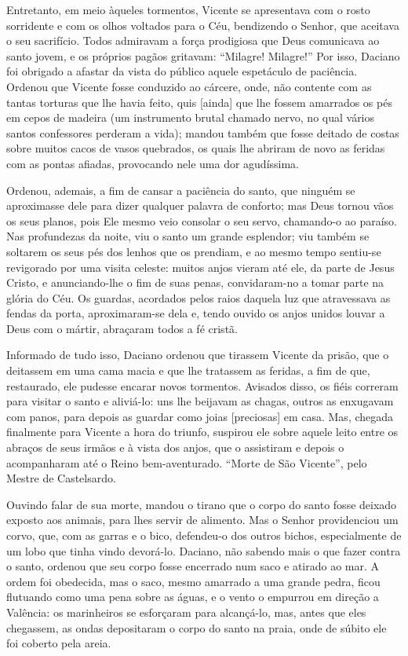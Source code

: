 \documentclass[a4paper,14pt]{extarticle} \usepackage[utf8]{inputenc}
\begin{document}
Entretanto, em meio àqueles tormentos, Vicente se apresentava com o rosto sorridente e com os olhos voltados para o Céu, bendizendo o Senhor, que aceitava o seu sacrifício. Todos admiravam a força prodigiosa que Deus comunicava ao santo jovem, e os próprios pagãos gritavam: “Milagre! Milagre!” Por isso, Daciano foi obrigado a afastar da vista do público aquele espetáculo de paciência. Ordenou que Vicente fosse conduzido ao cárcere, onde, não contente com as tantas torturas que lhe havia feito, quis [ainda] que lhe fossem amarrados os pés em cepos de madeira (um instrumento brutal chamado nervo, no qual vários santos confessores perderam a vida); mandou também que fosse deitado de costas sobre muitos cacos de vasos quebrados, os quais lhe abriram de novo as feridas com as pontas afiadas, provocando nele uma dor agudíssima. 

Ordenou, ademais, a fim de cansar a paciência do santo, que ninguém se aproximasse dele para dizer qualquer palavra de conforto; mas Deus tornou vãos os seus planos, pois Ele mesmo veio consolar o seu servo, chamando-o ao paraíso. Nas profundezas da noite, viu o santo um grande esplendor; viu também se soltarem os seus pés dos lenhos que os prendiam, e ao mesmo tempo sentiu-se revigorado por uma visita celeste: muitos anjos vieram até ele, da parte de Jesus Cristo, e anunciando-lhe o fim de suas penas, convidaram-no a tomar parte na glória do Céu. Os guardas, acordados pelos raios daquela luz que atravessava as fendas da porta, aproximaram-se dela e, tendo ouvido os anjos unidos louvar a Deus com o mártir, abraçaram todos a fé cristã. 

Informado de tudo isso, Daciano ordenou que tirassem Vicente da prisão, que o deitassem em uma cama macia e que lhe tratassem as feridas, a fim de que, restaurado, ele pudesse encarar novos tormentos. Avisados disso, os fiéis correram para visitar o santo e aliviá-lo: uns lhe beijavam as chagas, outros as enxugavam com panos, para depois as guardar como joias [preciosas] em casa. Mas, chegada finalmente para Vicente a hora do triunfo, suspirou ele sobre aquele leito entre os abraços de seus irmãos e à vista dos anjos, que o assistiram e depois o acompanharam até o Reino bem-aventurado.
“Morte de São Vicente”, pelo Mestre de Castelsardo.

Ouvindo falar de sua morte, mandou o tirano que o corpo do santo fosse deixado exposto aos animais, para lhes servir de alimento. Mas o Senhor providenciou um corvo, que, com as garras e o bico, defendeu-o dos outros bichos, especialmente de um lobo que tinha vindo devorá-lo. Daciano, não sabendo mais o que fazer contra o santo, ordenou que seu corpo fosse encerrado num saco e atirado ao mar. A ordem foi obedecida, mas o saco, mesmo amarrado a uma grande pedra, ficou flutuando como uma pena sobre as águas, e o vento o empurrou em direção a Valência: os marinheiros se esforçaram para alcançá-lo, mas, antes que eles chegassem, as ondas depositaram o corpo do santo na praia, onde de súbito ele foi coberto pela areia. 
\end{document}
